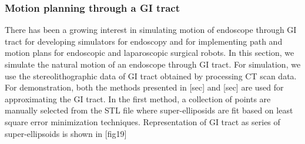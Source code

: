 \documentclass[12pt,a4]{article}
\begin{document}
\subsubsection{Motion planning through a GI tract}
There has been a growing interest in simulating motion of endoscope through GI tract for developing simulators for endoscopy and for implementing path and motion plans for endoscopic and laparoscopic surgical robots. In this section, we simulate the natural motion of an endoscope through GI tract. For simulation, we use the stereolithographic data of GI tract obtained by processing CT scan data. For demonstration, both the methods presented in [sec] and [sec] are used for approximating the GI tract. In the first method, a collection of points are manually selected from the STL file where super-elliposids are fit based on least square error minimization techniques.  Representation of GI tract as series of super-ellipsoids is shown in [fig19]
\end{document}
